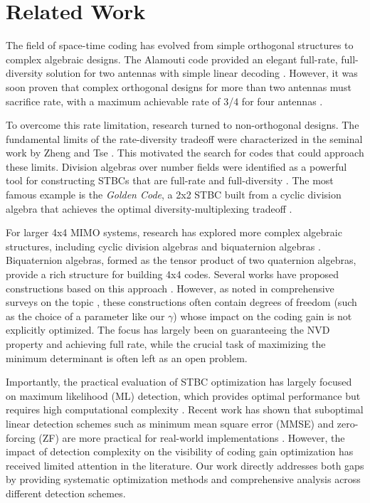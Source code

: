 \section{Related Work}

The field of space-time coding has evolved from simple orthogonal structures to complex algebraic designs. 
The Alamouti code provided an elegant full-rate, full-diversity solution for two antennas with simple linear decoding \cite{5}. 
However, it was soon proven that complex orthogonal designs for more than two antennas must sacrifice rate, with a maximum achievable rate of 3/4 for four antennas \cite{1}.

To overcome this rate limitation, research turned to non-orthogonal designs. 
The fundamental limits of the rate-diversity tradeoff were characterized in the seminal work by Zheng and Tse \cite{2}. 
This motivated the search for codes that could approach these limits. 
Division algebras over number fields were identified as a powerful tool for constructing STBCs that are full-rate and full-diversity \cite{3}. 
The most famous example is the \emph{Golden Code}, a 2x2 STBC built from a cyclic division algebra that achieves the optimal diversity-multiplexing tradeoff \cite{6}.

For larger 4x4 MIMO systems, research has explored more complex algebraic structures, including cyclic division algebras and biquaternion algebras \cite{7}. 
Biquaternion algebras, formed as the tensor product of two quaternion algebras, provide a rich structure for building 4x4 codes. 
Several works have proposed constructions based on this approach \cite{8,9}. 
However, as noted in comprehensive surveys on the topic \cite{10}, these constructions often contain degrees of freedom (such as the choice of a parameter like our $\gamma$) whose impact on the coding gain is not explicitly optimized. 
The focus has largely been on guaranteeing the NVD property and achieving full rate, while the crucial task of maximizing the minimum determinant is often left as an open problem.

Importantly, the practical evaluation of STBC optimization has largely focused on maximum likelihood (ML) detection, which provides optimal performance but requires high computational complexity \cite{11,12}. 
Recent work has shown that suboptimal linear detection schemes such as minimum mean square error (MMSE) and zero-forcing (ZF) are more practical for real-world implementations \cite{13,14}. 
However, the impact of detection complexity on the visibility of coding gain optimization has received limited attention in the literature. 
Our work directly addresses both gaps by providing systematic optimization methods and comprehensive analysis across different detection schemes.
